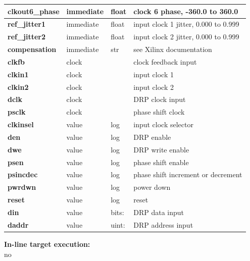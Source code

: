 \begin{tabular}{| l | l | l | l |}
            {\bf clkout6\_phase}          & immediate & float & clock 6 phase, -360.0 to 360.0\\ \hline
            {\bf ref\_jitter1}            & immediate & float & input clock 1 jitter, 0.000 to 0.999\\ \hline
            {\bf ref\_jitter2}            & immediate & float & input clock 2 jitter, 0.000 to 0.999\\ \hline
            {\bf compensation}            & immediate & str   & see Xilinx documentation\\ \hline
            {\bf clkfb}                   & clock     &       & clock feedback input   \\ \hline
            {\bf clkin1}                  & clock     &       & input clock 1   \\ \hline 
            {\bf clkin2}                  & clock     &       & input clock 2    \\ \hline
            {\bf dclk}                    & clock     &       & DRP clock input   \\ \hline
            {\bf psclk}                   & clock     &       & phase shift clock   \\ \hline 
            {\bf clkinsel}                & value     & log   & input clock selector \\ \hline
            {\bf den}                     & value     & log   & DRP enable  \\ \hline
            {\bf dwe}                     & value     & log   & DRP write enable   \\ \hline
            {\bf psen}                    & value     & log   & phase shift enable  \\ \hline
            {\bf psincdec}                & value     & log   & phase shift increment or decrement \\ \hline
            {\bf pwrdwn}                  & value     & log   & power down  \\ \hline
            {\bf reset}                   & value     & log   & reset  \\ \hline
            {\bf din}                     & value     & bits: & DRP data input   \\ \hline
            {\bf daddr}                   & value     & uint: & DRP address input    \\ \hline 
            \end{tabular}

            {\bf In-line target execution:} \\
            no

